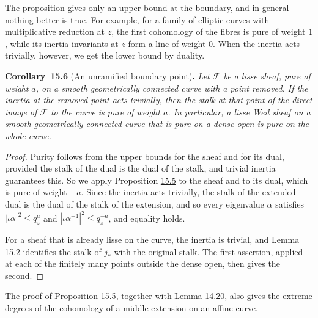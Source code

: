 \documentclass[11pt]{article}
\newenvironment{bpstatement}[2]{\par\addvspace{0.6\baselineskip}\noindent\textbf{#1}#2\textbf{.}\enspace\ignorespaces}
  {\par\addvspace{0.4\baselineskip}}
\newenvironment{bpstatementit}[2]{\begin{bpstatement}{#1}{#2}\itshape\ignorespaces}{\end{bpstatement}}
\begin{document}
\label{bp136}%
The proposition gives only an upper bound at the boundary, and in general nothing better is true. For example, for a family of elliptic curves with multiplicative reduction at \(z\), the first cohomology of the fibres is pure of weight \(1\), while its inertia invariants at \(z\) form a line of weight \(0\). When the inertia acts trivially, however, we get the lower bound by duality.

\label{bp137}%
\begin{bpstatementit}{Corollary~15.6}{ (An unramified boundary point)}
Let \(\mathcal F\) be a lisse sheaf, pure of weight \(a\), on a smooth geometrically connected curve with a point removed. If the inertia at the removed point acts trivially, then the stalk at that point of the direct image of \(\mathcal F\) to the curve is pure of weight \(a\). In particular, a lisse Weil sheaf on a smooth geometrically connected curve that is pure on a dense open is pure on the whole curve.
\end{bpstatementit}

\begin{proof}[{Proof}]\label{bp138}%
Purity follows from the upper bounds for the sheaf and for its dual, provided the stalk of the dual is the dual of the stalk, and trivial inertia guarantees this. So we apply Proposition \hyperref[bp134]{15.5} to the sheaf and to its dual, which is pure of weight \(-a\).  Since the inertia acts trivially, the stalk of the extended dual is the dual of the stalk of the extension, and so every eigenvalue \(\alpha\) satisfies \(|\iota\alpha|^2\le q_z^a\) and \(|\iota\alpha^{-1}|^2\le q_z^{-a}\), and equality holds.

For a sheaf that is already lisse on the curve, the inertia is trivial, and Lemma \hyperref[bp127]{15.2} identifies the stalk of \(j_*\) with the original stalk. The first assertion, applied at each of the finitely many points outside the dense open, then gives the second.
\end{proof}

\label{bp139}%
The proof of Proposition \hyperref[bp134]{15.5}, together with Lemma \hyperref[bp104]{14.20}, also gives the extreme degrees of the cohomology of a middle extension on an affine curve.
\end{document}
